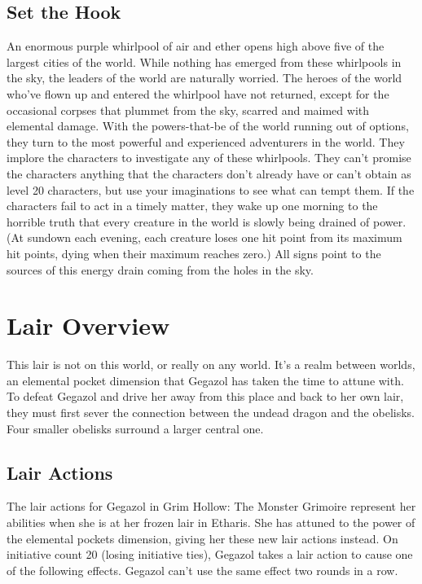 \documentclass[10pt,a4paper,twoside,twocolumn,openany,bg=print,nodeprecatedcode]{dndbook}
\begin{document}
\subsection{Set the Hook}
An enormous purple whirlpool of air and ether opens high above five of the largest cities of the world. While nothing has emerged from these whirlpools in the sky, the leaders of the world are naturally worried. The heroes of the world who've flown up and entered the whirlpool have not returned, except for the occasional corpses that plummet from the sky, scarred and maimed with elemental damage.
With the powers-that-be of the world running out of options, they turn to the most powerful and experienced adventurers in the world. They implore the characters to investigate any of these whirlpools. They can't promise the characters anything that the characters don't already have or can't obtain as level 20 characters, but use your imaginations to see what can tempt them.
If the characters fail to act in a timely matter, they wake up one morning to the horrible truth that every creature in the world is slowly being drained of power. (At sundown each evening, each creature loses one hit point from its maximum hit points, dying when their maximum reaches zero.) All signs point to the sources of this energy drain coming from the holes in the sky.
\section{Lair Overview}
This lair is not on this world, or really on any world. It's a realm between worlds, an elemental pocket dimension that Gegazol has taken the time to attune with. To defeat Gegazol and drive her away from this place and back to her own lair, they must first sever the connection between the undead dragon and the obelisks. Four smaller obelisks surround a larger central one.
\subsection{Lair Actions}
The lair actions for Gegazol in Grim Hollow: The Monster Grimoire represent her abilities when she is at her frozen lair in Etharis. She has attuned to the power of the elemental pockets dimension, giving her these new lair actions instead.
On initiative count 20 (losing initiative ties), Gegazol takes a lair action to cause one of the following effects. Gegazol can't use the same effect two rounds in a row.
\end{document}
